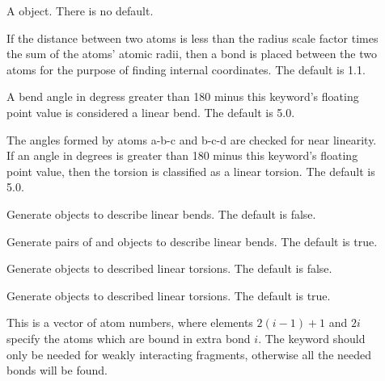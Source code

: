 \begin{description}
  \item[] A  object.  There is no
    default.

  \item[] If the distance between two atoms is
      less than the radius scale factor times the sum of the atoms' atomic
      radii, then a bond is placed between the two atoms for the purpose of
      finding internal coordinates.  The default is 1.1.

  \item[] A bend angle in degress greater
      than 180 minus this keyword's floating point value is considered a
      linear bend. The default is 5.0.

  \item[] The angles formed by atoms a-b-c
      and b-c-d are checked for near linearity.  If an angle in degrees is
      greater than 180 minus this keyword's floating point value, then the
      torsion is classified as a linear torsion. The default is 5.0.

  \item[] Generate  objects
      to describe linear bends.  The default is false.

  \item[] Generate pairs of 
      and  objects to describe linear bends.  The
      default is true.

  \item[] Generate  objects
      to described linear torsions.  The default is false.

  \item[] Generate 
      objects to described linear torsions.  The default is true.


  \item[] This is a vector of atom numbers, where
     elements $2 (i-1) + 1$ and $2 i$ specify the atoms which
     are bound in extra bond $i$.  The  keyword should
     only be needed for weakly interacting fragments, otherwise all the
     needed bonds will be found.

\end{description}

